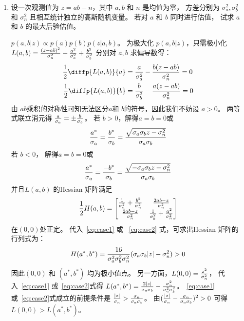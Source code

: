 \documentclass{article}
\DeclarePairedDelimiter\abs{\lvert}{\rvert}
\begin{document}
\courseheader
{}
\begin{enumerate}
\item 设一次观测值为 $ z = ab +n $，其中 $ a, b $ 和 $n $ 是均值为零， 方差分别为 $ \sigma_a^2, \sigma_b^2 $ 
和  $ \sigma_n^2 $ 且相互统计独立的高斯随机变量。 若对 $ a $ 和 $ b $ 同时进行估值， 试求 $ a $ 和 $ b $ 
的最大后验估值。
\begin{solution}
$p(a, b | z) \propto p(a)p(b) p(z | a,b) $。 为极大化 $ p(a,b | z)$，只需极小化
$ L(a, b)= { ( z - ab)^2 \over \sigma_n^2 } + { a^2 \over \sigma_a^2} + { b^2 \over \sigma_b^2} $
分别对 $a, b $ 求偏导数得：
\begin{align*}
{1 \over 2}\diffp{L(a, b)}{a}  & = { a \over \sigma_a^2 } - { b(z-ab) \over \sigma_n^2 } = 0 \\
{1 \over 2}\diffp{L(a, b)}{b} & = { b \over \sigma_b^2} - {a(z-ab) \over \sigma_n^2} = 0
\end{align*}
由 $ab$乘积的对称性可知无法区分$a$和 $b$的符号，因此我们不妨设 $ a>0$。
两等式联立消元得 $ { a \over \sigma_a } = \pm{ b \over \sigma_b }$。 若 $ b>0$，解得$a=b=0$或
\begin{equation}\label{eq:case1}
{ a^* \over \sigma_a } = { b^* \over \sigma_b } = {\sqrt{\sigma_a \sigma_b z - \sigma_n^2} \over \sigma_a \sigma_b}
\end{equation}
若 $ b<0 $， 解得$a=b=0$或
\begin{equation}\label{eq:case2}
{ a^* \over \sigma_a } = { -b^* \over \sigma_b } = {\sqrt{-\sigma_a \sigma_b z - \sigma_n^2} \over \sigma_a \sigma_b}
\end{equation}
并且$L(a,b)$ 的Hessian 矩阵满足 
$$
{1 \over 2} H(a,b) = \begin{bmatrix} {1 \over \sigma_a^2 } + { b^2 \over \sigma_n^2 } & {2ab-z \over \sigma_n^2} 
\\ {2ab-z \over \sigma_n^2} & {1 \over \sigma_b^2} + {a^2 \over \sigma_n^2} \end{bmatrix}
$$
在$(0,0)$处正定。
代入~\eqref{eq:case1} 或 ~\eqref{eq:case2} 式，可求出Hessian 矩阵的行列式为：
\begin{equation}
H(a^*,b^*) = {16 \over \sigma^2_a\sigma^2_b\sigma^2_n}(\sigma_a\sigma_b\abs{z} - \sigma_n^2)>0
\end{equation}
因此$(0, 0)$ 和 $(a^*, b^*)$ 均为极小值点。
另一方面，$L(0, 0) = { z^2 \over \sigma_n^2}$，
代入~\eqref{eq:case1} 或~\eqref{eq:case2}式得 $L(a^*, b^*) = {2 \abs{z} \over \sigma_a \sigma_b} - {\sigma_n^2 \over \sigma_a^2 \sigma_b^2}$。~\eqref{eq:case1} 或~\eqref{eq:case2}式成立的前提条件是 $ {\abs{z} \over \sigma_n } > {\sigma_n \over \sigma_a \sigma_b} $。 由$ ({\abs{z} \over \sigma_n } - {\sigma_n \over \sigma_a \sigma_b} )^2> 0$ 可得 $L(0, 0) > L(a^*,b^*) $。


\end{solution}
\end{enumerate}
\end{document}
